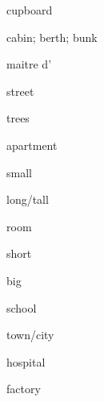\documentclass[avery5371,grid,frame]{flashcards}
\begin{document}
\begin{flashcard}{\LARGE cupboard}
\LARGE {}
\end{flashcard}
\begin{flashcard}{\LARGE cabin; berth; bunk}
\LARGE {}
\end{flashcard}
\begin{flashcard}{\LARGE maitre d'}
\LARGE {}
\end{flashcard}
\begin{flashcard}{\LARGE street}
\LARGE {}
\end{flashcard}
\begin{flashcard}{\LARGE trees}
\LARGE {}
\end{flashcard}
\begin{flashcard}{\LARGE apartment}
\LARGE {}
\end{flashcard}
\begin{flashcard}{\LARGE small}
\LARGE {}
\end{flashcard}
\begin{flashcard}{\LARGE long/tall}
\LARGE {}
\end{flashcard}
\begin{flashcard}{\LARGE room}
\LARGE {}
\end{flashcard}
\begin{flashcard}{\LARGE short}
\LARGE {}
\end{flashcard}
\begin{flashcard}{\LARGE big}
\LARGE {}
\end{flashcard}
\begin{flashcard}{\LARGE school}
\LARGE {}
\end{flashcard}
\begin{flashcard}{\LARGE town/city}
\LARGE {}
\end{flashcard}
\begin{flashcard}{\LARGE hospital}
\LARGE {}
\end{flashcard}
\begin{flashcard}{\LARGE factory}
\LARGE {}
\end{flashcard}
\end{document}
